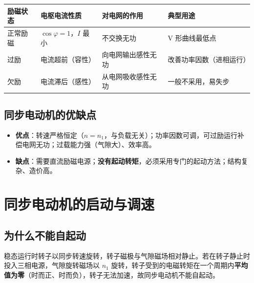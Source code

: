 \begin{center}
\begin{tabular}{@{}p{2.2cm}p{3.0cm}p{4.0cm}p{3.4cm}@{}}
\toprule
励磁状态 & 电枢电流性质 & 对电网的作用 & 典型用途 \\
\midrule
正常励磁 & $\cos\varphi=1$，$I$ 最小 & 不交换无功 & V 形曲线最低点 \\
过励 & 电流超前（容性） & 向电网输出感性无功 & 改善功率因数（进相运行） \\
欠励 & 电流滞后（感性） & 从电网吸收感性无功 & 一般不采用，易失步 \\
\bottomrule
\end{tabular}
\end{center}


\subsection{同步电动机的优缺点}
\begin{itemize}
  \item \textbf{优点}：转速严格恒定（$n=n_1$，与负载无关）；功率因数可调，可过励运行补偿电网无功；过载能力强（气隙大）、效率高。
  \item \textbf{缺点}：需要直流励磁电源；\textbf{没有起动转矩}，必须采用专门的起动方法；结构复杂、造价高。
\end{itemize}

\section{同步电动机的启动与调速}

\subsection{为什么不能自起动}
稳态运行时转子以同步转速旋转，转子磁极与气隙磁场相对静止。若在转子静止时投入三相电源，气隙旋转磁场以 $n_1$ 旋转，转子受到的电磁转矩在一个周期内\textbf{平均值为零}（时而正、时而负），转子无法加速，故同步电动机不能自起动。

